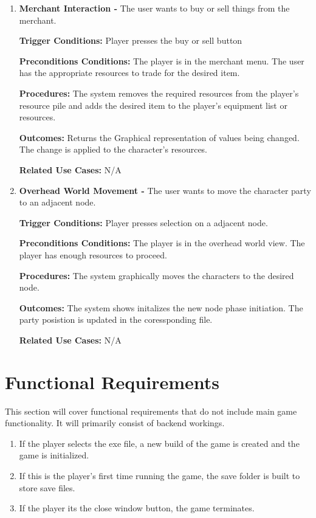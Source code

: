 \documentclass{article}
\begin{document}
\begin{enumerate}[{PUC}1. ]
	\item \textbf{Merchant Interaction -} The user wants to buy or sell things from the merchant. \par
\textbf{Trigger Conditions: }Player presses the buy or sell button \par
\textbf{Preconditions Conditions: }The player is in the merchant menu. The user has the appropriate resources to trade for the desired item.\par
\textbf{Procedures: }The system removes the required resources from the player's resource pile and adds the desired item to the player's equipment list or resources. \par
\textbf{Outcomes: }Returns the Graphical representation of values being changed. The change is applied to the character's resources. \par
\textbf{Related Use Cases: }N/A \par

	\item \textbf{Overhead World Movement -} The user wants to move the character party to an adjacent node. \par
\textbf{Trigger Conditions: }Player presses selection on a adjacent node. \par
\textbf{Preconditions Conditions: }The player is in the overhead world view. The player has enough resources to proceed.\par
\textbf{Procedures: }The system graphically moves the characters to the desired node. \par
\textbf{Outcomes: }The system shows initalizes the new node phase initiation. The party posistion is updated in the coressponding file. \par
\textbf{Related Use Cases: }N/A \par
\end{enumerate}
\section{Functional Requirements}
\quad This section will cover functional requirements that do not include main game functionality. It will primarily consist of backend workings.
\begin{enumerate}[{FR}1. ]
	\item If the player selects the exe file, a new build of the game is created and the game is initialized.
	\item If this is the player's first time running the game, the save folder is built to store save files.
	\item If the player its the close window button, the game terminates.
\end{enumerate}
\end{document}
